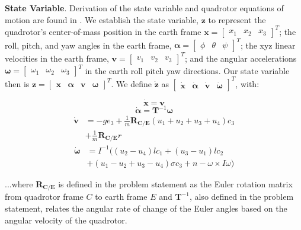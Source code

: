 \documentclass{article}
\begin{document}
\begin{multicols}{2}
\noindent \textbf{State Variable}.  Derivation of the state variable and quadrotor equations of motion are found in \cite{FaalD}.  We establish the state variable, $\mathbf{z}$ to represent the quadrotor's center-of-mass position in the earth frame $\mathbf{x}=\begin{bmatrix}x_1 & x_2 & x_3\end{bmatrix}^T$; the roll, pitch, and yaw angles in the earth frame, $\bm{\alpha}
=\begin{bmatrix}\phi & \theta & \psi\end{bmatrix}^T$; the xyz linear velocities in the earth frame, $\mathbf{v}=\begin{bmatrix}v_1 & v_2 & v_3\end{bmatrix}^T$; and the angular accelerations $\bm{\omega}=\begin{bmatrix}\omega_1 & \omega_2 & \omega_3\end{bmatrix}^T$ in the earth roll pitch yaw directions. Our state variable then is $\mathbf{z}=\begin{bmatrix}\mathbf{x} &\bm{\alpha}&\mathbf{v}&\bm{\omega}\end{bmatrix}^T$. We define $\boldsymbol{\dot{z}}$ as $\begin{bmatrix} \mathbf{\dot{x}} & \bm{\dot{\alpha}}&\mathbf{\dot{v}}&\bm{\dot{\omega}} \end{bmatrix}^T$, with:

\begin{equation}
    \mathbf{\dot{x}} =\mathbf{v}
\end{equation}
\begin{equation}
    \bm{\dot{\alpha}} =\mathbf{T}^{-1}\bm{\omega}
\end{equation}
\begin{align}
    \mathbf{\dot{v}} &=-ge_3+\frac{1}{m}\mathbf{R_{C/E}}(u_1+u_2+u_3+u_4)c_3 \nonumber\\ &+\frac{1}{m}\mathbf{R_{C/E}}r
\end{align}
\begin{align}
    \bm{\dot{\omega}} &=I^{-1}((u_2-u_4)lc_1+(u_3-u_1)lc_2 \nonumber\\ &+(u_1-u_2+u_3-u_4)\sigma c_3+n-\omega \times I \omega)
\end{align}

\noindent ...where $\mathbf{R_{C/E}}$ is defined in the problem statement as the Euler rotation matrix from quadrotor frame $C$ to earth frame $E$ and $\mathbf{T}^{-1}$, also defined in the problem statement, relates the angular rate of change of the Euler angles based on the angular velocity of the quadrotor.


\end{multicols}
\end{document}
